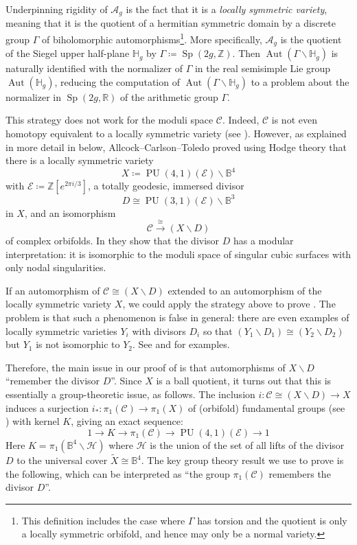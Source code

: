 \documentclass[11pt]{amsart}
\theoremstyle{plain}
\theoremstyle{definition}
\theoremstyle{remark}
\newcommand{\bbB}{\mathbb{B}}
\newcommand{\bbH}{\mathbb{H}}
\newcommand{\bbR}{\mathbb{R}}
\newcommand{\bbZ}{\mathbb{Z}}
\newcommand{\calA}{\mathcal{A}}
\newcommand{\calC}{\mathcal{C}}
\newcommand{\calE}{\mathcal{E}}
\newcommand{\calH}{\mathcal{H}}
\newcommand{\Gam}{\Gamma}
\DeclareMathOperator{\PU}{PU}
\DeclareMathOperator{\Sp}{Sp}
\DeclareMathOperator{\Aut}{Aut}
\newcommand{\bs}{\backslash}
\newcommand{\lra}{\longrightarrow}
\newcommand{\ssm}{\smallsetminus}
\begin{document}
Underpinning rigidity of $\calA_g$ is the fact that it is a \emph{locally symmetric variety}, meaning that it is the quotient of a hermitian symmetric domain by a discrete group $\Gam$ of biholomorphic automorphisms\footnote{This definition includes the case where $\Gam$ has torsion and the quotient is only a locally symmetric orbifold, and hence may only be a normal variety.}. More specifically, $\calA_g$ is the quotient of the Siegel upper half-plane $\bbH_g$ by $\Gam \coloneqq \Sp(2g,\bbZ)$. Then $\Aut(\Gam \backslash \bbH_g)$ is naturally identified with the normalizer of $\Gam$ in the real semisimple Lie group $\Aut(\bbH_g)$, reducing the computation of $\Aut(\Gam \backslash \bbH_g)$ to a problem about the normalizer in $\Sp(2g, \bbR)$ of the arithmetic group $\Gamma$.

This strategy does not work for the moduli space $\calC$. Indeed, $\calC$ is not even homotopy equivalent to a locally symmetric variety (see \cite[Thm.\ 1.2]{ACTorthogonal}). However, as explained in more detail in  below, Allcock--Carlson--Toledo \cite{ACT} proved using Hodge theory that there is a locally symmetric variety
	\[
	X \coloneqq \PU(4,1)(\calE) \bs \bbB^4
	\]
with $\calE \coloneqq \bbZ[e^{2\pi i/3}]$, a totally geodesic, immersed divisor
	\[
	D \cong \PU(3,1)(\calE) \bs \bbB^3
	\]
in $X$, and an isomorphism
	\[
		\calC\stackrel{\cong}{\lra} (X \ssm D)
	\]
of complex orbifolds. In \cite{ACT} they show that the divisor $D$ has a modular interpretation: it is isomorphic to the moduli space of singular cubic surfaces with only nodal singularities.

If an automorphism of $\calC\cong (X \ssm D)$ extended to an automorphism of the locally symmetric variety $X$, we could apply the strategy above to prove . The problem is that such a phenomenon is false in general: there are even examples of locally symmetric varieties $Y_i$ with divisors $D_i$ so that $(Y_1 \ssm D_1)\cong (Y_2 \ssm D_2)$ but $Y_1$ is not isomorphic to $Y_2$. See \cite{zbMATH00606995} and \cite{MR1136204} for examples.

Therefore, the main issue in our proof of  is that automorphisms of $X \ssm D$ ``remember the divisor $D$''. Since $X$ is a ball quotient, it turns out that this is essentially a group-theoretic issue, as follows. The inclusion $i:\calC\cong (X \ssm D)\to X$ induces a surjection $i_*:\pi_1(\calC)\to\pi_1(X)$ of (orbifold) fundamental groups (see ) with kernel $K$, giving an exact sequence:
	\begin{equation}\label{eq:exact1}
		1 \lra K \lra \pi_1(\calC) \lra \PU(4,1)(\calE)\lra 1
	\end{equation}
Here $K=\pi_1(\bbB^4 \ssm \calH)$ where $\calH$ is the union of the set of all lifts of the divisor $D$ to the universal cover $\widetilde{X}\cong\bbB^4$. The key group theory result we use to prove  is the following, which can be interpreted as ``the group $\pi_1(\calC)$ 
remembers the divisor $D$''.
\end{document}

